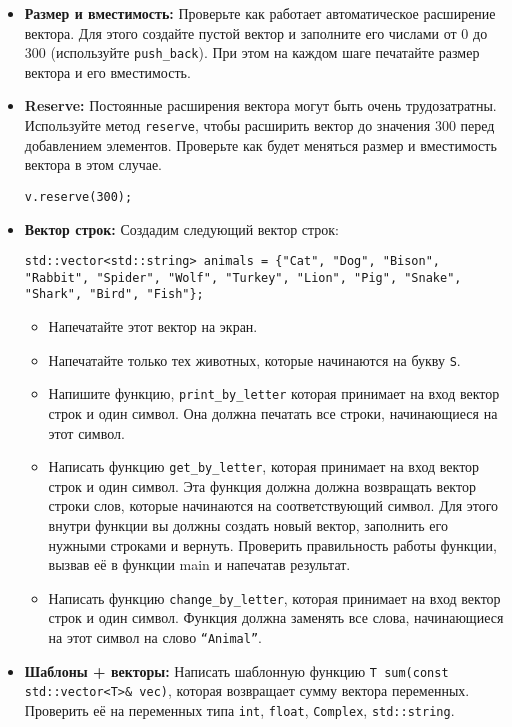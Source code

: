 \documentclass{article}
\begin{document}
\begin{itemize}
\item \textbf{Размер и вместимость:} Проверьте как работает автоматическое расширение вектора. Для этого создайте пустой вектор и заполните его числами от 0 до 300 (используйте \texttt{push\_back}). При этом на каждом шаге печатайте размер вектора и его вместимость.
\item \textbf{Reserve:} Постоянные расширения вектора могут быть очень трудозатратны. Используйте метод \texttt{reserve}, чтобы расширить вектор до значения 300 перед добавлением элементов. Проверьте как будет меняться размер и вместимость вектора в этом случае.
\begin{lstlisting}
v.reserve(300);
\end{lstlisting}
\item \textbf{Вектор строк:} Создадим следующий вектор строк:
\begin{lstlisting}
std::vector<std::string> animals = {"Cat", "Dog", "Bison", "Rabbit", "Spider", "Wolf", "Turkey", "Lion", "Pig", "Snake", "Shark", "Bird", "Fish"};
\end{lstlisting}
\begin{itemize}
\item Напечатайте этот вектор на экран.
\item Напечатайте только тех животных, которые начинаются на букву \texttt{S}.
\item Напишите функцию, \texttt{print\_by\_letter} которая принимает на вход вектор строк и один символ. Она должна печатать все строки, начинающиеся на этот символ.
\item Написать функцию \texttt{get\_by\_letter}, которая принимает на вход вектор строк и один символ. Эта функция должна должна возвращать вектор строки слов, которые начинаются на соответствующий символ. Для этого внутри функции вы должны создать новый вектор, заполнить его нужными строками и вернуть. Проверить правильность работы функции, вызвав её в функции main и напечатав результат.
\item Написать функцию \texttt{change\_by\_letter}, которая принимает на вход вектор строк и один символ. Функция должна заменять все слова, начинающиеся на этот символ на слово \texttt{``Animal''}.
\end{itemize}

\item \textbf{Шаблоны + векторы:} Написать шаблонную функцию \texttt{T sum(const std::vector<T>\& vec)}, которая возвращает сумму вектора переменных. Проверить её на переменных типа \texttt{int}, \texttt{float}, \texttt{Complex}, \texttt{std::string}.
\end{itemize}
\end{document}

